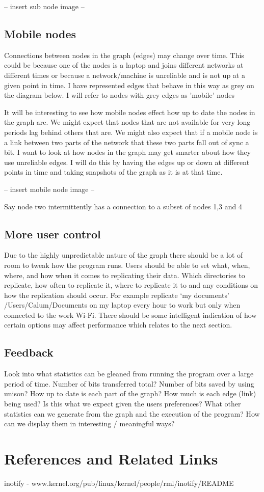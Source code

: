 \documentclass[12pt]{article}
\begin{document}
-- insert sub node image --

\subsection{Mobile nodes}

Connections between nodes in the graph (edges) may
change over time. This could be because one of the nodes
is a laptop and joins different networks at different
times or because a network/machine is unreliable and is
not up at a given point in time. I have represented
edges that behave in this way as grey on the diagram below.
I will refer to nodes with grey edges as 'mobile' nodes

It will be interesting to see how mobile nodes effect how
up to date the nodes in the graph are. We might expect that
nodes that are not available for very long periods lag behind
others that are. We might also expect that if a mobile
node is a link between two parts of the network that
these two parts fall out of sync a bit. I want to look
at how nodes in the graph may get smarter about how
they use unreliable edges. I will do this by having
the edges up or down at different points in time
and taking snapshots of the graph as it is at that time.

-- insert mobile node image --

Say node two intermittently has a connection to a subset of
nodes 1,3 and 4

\subsection{More user control}

Due to the highly unpredictable nature of the graph there
should be a lot of room to tweak how the program runs. 
Users should be able to set what, when, where, and how when
it comes to replicating their data. Which directories to replicate,
how often to replicate it, where to replicate it to and any
conditions on how the replication should occur. For example replicate
‘my documents’ /Users/Calum/Documents on my laptop every hour to
work but only when connected to the work Wi-Fi.
There should be some intelligent indication of how certain options
may affect performance which relates to the next section.

\subsection{Feedback}

Look into what statistics can be gleaned from running
the program over a large period of time.
Number of bits transferred total? Number of bits saved by
using unison? How up to date is each part of the graph?
How much is each edge (link) being used? Is this what we
expect given the users preferences? What other statistics
can we generate from the graph and the execution of the
program? How can we display them in interesting / meaningful ways?

\section{References and Related Links}
inotify - www.kernel.org/pub/linux/kernel/people/rml/inotify/README
\end{document}
